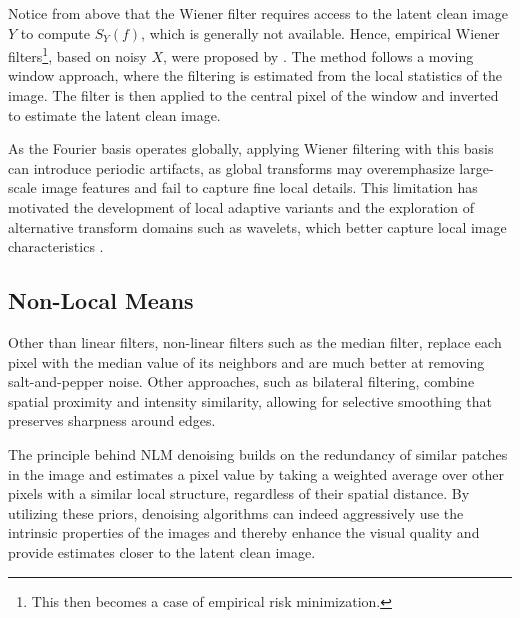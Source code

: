 Notice from above that the Wiener filter requires access to the latent clean image $Y$ to compute $S_Y(f)$, which is generally not available. Hence, empirical Wiener filters\footnote{This then becomes a case of empirical risk minimization.}, based on noisy $X$, were proposed by \citeauthor{yaroslavskyDigitalPictureProcessing1985} \cite{yaroslavskyDigitalPictureProcessing1985}. The method follows a moving window approach, where the filtering is estimated from the local statistics of the image. The filter is then applied to the central pixel of the window and inverted to estimate the latent clean image.

As the Fourier basis operates globally, applying Wiener filtering with this basis can introduce periodic artifacts, as global transforms may overemphasize large-scale image features and fail to capture fine local details. This limitation has motivated the development of local adaptive variants and the exploration of alternative transform domains such as wavelets, which better capture local image characteristics \cite{buadesReviewImageDenoising2005}.

\subsection{Non-Local Means}

Other than linear filters, non-linear filters such as the median filter, replace each pixel with the median value of its neighbors and are much better at removing salt-and-pepper noise. Other approaches, such as bilateral filtering, combine spatial proximity and intensity similarity, allowing for selective smoothing that  preserves sharpness around edges. 

The principle behind \gls{NLM} denoising builds on the redundancy of similar patches in the image and estimates a pixel value by taking a weighted average over other pixels with a similar local structure, regardless of their spatial distance. By utilizing these priors, denoising algorithms can indeed aggressively use the intrinsic properties of the images and thereby enhance the visual quality and provide estimates closer to the latent clean image.

